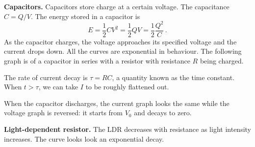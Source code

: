 \documentclass{article}
\begin{document}
\textbf{Capacitors.} Capacitors store charge at a certain voltage. The capacitance $C=Q/V$. The energy stored in a capacitor is
\[
E=\frac{1}{2}CV^2 = \frac{1}{2}QV = \frac{1}{2}\frac{Q^2}{C}\,.
\]
As the capacitor charges, the voltage approaches its specified voltage and the current drops down. All the curves are exponential in behaviour. The following graph is of a capacitor in series with a resistor with resistance $R$ being charged.
\begin{figure}[H]
    \centering
\end{figure}
The rate of current decay is $\tau=RC$, a quantity known as the time constant. When $t>\tau$, we can take $I$ to be roughly flattened out.

When the capacitor discharges, the current graph looks the same while the voltage graph is reversed: it starts from $V_0$ and decays to zero.

\textbf{Light-dependent resistor.} The LDR decreases with resistance as light intensity increases. The curve looks look an exponential decay.
\end{document}
